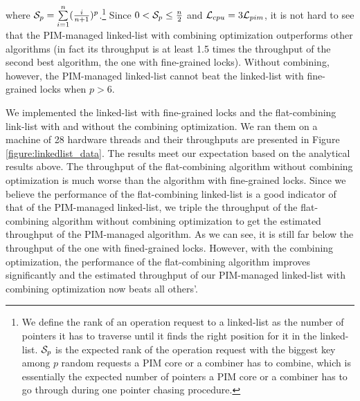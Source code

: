 where $\mathcal{S}_{p} = \sum\limits_{i=1}^{n} ({i \over n+1})^{p}$.\footnote{
We define the rank of an operation request to a linked-list as the number of pointers
it has to traverse until it finds the right position for it in the linked-list.
$\mathcal{S}_{p}$ is the expected rank of the operation request with the biggest key
among $p$ random requests a PIM core or a combiner has to combine,
which is essentially the expected number of pointers a PIM core or a combiner
has to go through during one pointer chasing procedure.} 
Since $0 < \mathcal{S}_{p} \le {n \over 2}$ and $\mathcal{L}_{cpu} = 3\mathcal{L}_{pim}$,
it is not hard to see that the PIM-managed linked-list with
combining optimization outperforms other algorithms
(in fact its throughput is at least 1.5 times the throughput of
the second best algorithm, the one with fine-grained locks).
Without combining, however, the PIM-managed linked-list cannot
beat the linked-list with fine-grained locks when $p > 6$.

We implemented the linked-list with fine-grained locks
and the flat-combining link-list with and without the combining optimization.
We ran them on a machine of 28 hardware threads
and their throughputs are presented in Figure \ref{figure:linkedlist_data}.
The results meet our expectation based on the analytical results above.
The throughput of the flat-combining algorithm without combining optimization
is much worse than the algorithm with fine-grained locks.
Since we believe the performance of the flat-combining linked-list is a good 
indicator of that of the PIM-managed linked-list, we triple the throughput of the
flat-combining algorithm without combining optimization to get the estimated
throughput of the PIM-managed algorithm. 
As we can see, it is still far below the throughput of the one with fined-grained locks.
However, with the combining optimization, the performance of the flat-combining
algorithm improves significantly and the estimated throughput of our PIM-managed
linked-list with combining optimization now beats all others'.



